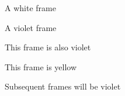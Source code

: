 \documentclass{beamer}
\begin{document}
\begin{frame}{A white frame}
\end{frame}
\begin{frame}{A violet frame}
\end{frame}
\begin{frame}{This frame is also violet}
\end{frame}
{
\begin{frame}{This frame is yellow}
\end{frame}
}
\begin{frame}{Subsequent frames will be violet}
\end{frame}
\end{document}
